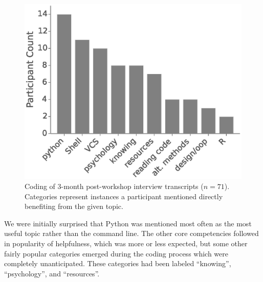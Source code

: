 \documentclass[10pt, twocolumn]{article}
\begin{document}
\begin{figure}
\centering
\includegraphics[width=\linewidth]{InterviewResponses}
\caption{
    Coding of 3-month post-workshop interview transcripts ($n=71$).
    Categories represent instances a participant mentioned
    directly benefiting from the given topic.
}
\label{InterviewResponses}
\end{figure}

We were initially surprised that Python was mentioned most often as the most useful topic rather than the command line.
The other core competencies followed in popularity of helpfulness,
which was more or less expected,
but some other fairly popular categories emerged during the coding process which were completely unanticipated.
These categories had been labeled ``knowing'', ``psychology'', and ``resources''.
\end{document}
